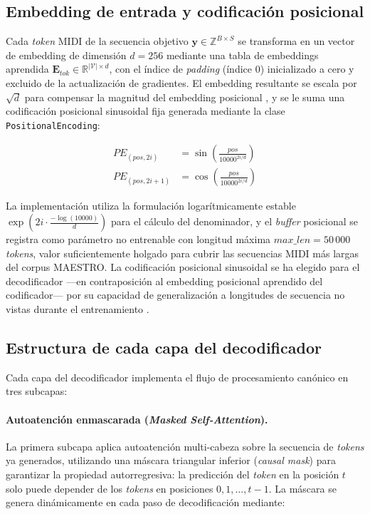 \subsection{Embedding de entrada y codificación posicional}

Cada \textit{token} MIDI de la secuencia objetivo $\mathbf{y} \in \mathbb{Z}^{B \times S}$
se transforma en un vector de embedding de dimensión $d = 256$ mediante una tabla de
embeddings aprendida $\mathbf{E}_{tok} \in \mathbb{R}^{|\mathcal{V}| \times d}$, con el
índice de \textit{padding} (índice 0) inicializado a cero y excluido de la actualización
de gradientes. El embedding resultante se escala por $\sqrt{d}$ para compensar la
magnitud del embedding posicional \cite{vaswani2017attention}, y se le suma una
codificación posicional sinusoidal fija generada mediante la clase
\texttt{PositionalEncoding}:

\begin{align}
    PE_{(pos, 2i)}   &= \sin\!\left(\frac{pos}{10000^{2i/d}}\right) \label{eq:pe_sin} \\
    PE_{(pos, 2i+1)} &= \cos\!\left(\frac{pos}{10000^{2i/d}}\right) \label{eq:pe_cos}
\end{align}

La implementación utiliza la formulación logarítmicamente estable
$\exp\!\left(2i \cdot \frac{-\log(10000)}{d}\right)$ para el cálculo del denominador,
y el \textit{buffer} posicional se registra como parámetro no entrenable con longitud
máxima $max\_len = 50\,000$ \textit{tokens}, valor suficientemente holgado para cubrir
las secuencias MIDI más largas del corpus MAESTRO. La codificación posicional sinusoidal
se ha elegido para el decodificador —en contraposición al embedding posicional aprendido
del codificador— por su capacidad de generalización a longitudes de secuencia no vistas
durante el entrenamiento \cite{vaswani2017attention}.

\subsection{Estructura de cada capa del decodificador}

Cada capa del decodificador implementa el flujo de procesamiento canónico en tres
subcapas:

\paragraph{Autoatención enmascarada (\textit{Masked Self-Attention}).}
La primera subcapa aplica autoatención multi-cabeza sobre la secuencia de \textit{tokens}
ya generados, utilizando una máscara triangular inferior (\textit{causal mask}) para
garantizar la propiedad autorregresiva: la predicción del \textit{token} en la posición
$t$ solo puede depender de los \textit{tokens} en posiciones $0, 1, \ldots, t-1$. La
máscara se genera dinámicamente en cada paso de decodificación mediante:

